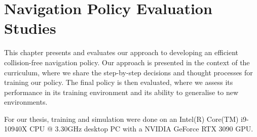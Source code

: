 \chapter{Navigation Policy Evaluation Studies}
\label{chap:7_navigation_policy_evaluation_studies}

This chapter presents and evaluates our approach to developing an efficient collision-free navigation policy. Our approach is presented in the context of the curriculum, where we share the step-by-step decisions and thought processes for training our policy.
The final policy is then evaluated, where we assess its performance in its training environment and its ability to generalise to new environments.

For our thesis, training and simulation were done on an Intel(R) Core(TM) i9-10940X CPU @ 3.30GHz desktop PC with a NVIDIA GeForce RTX 3090 GPU. 


